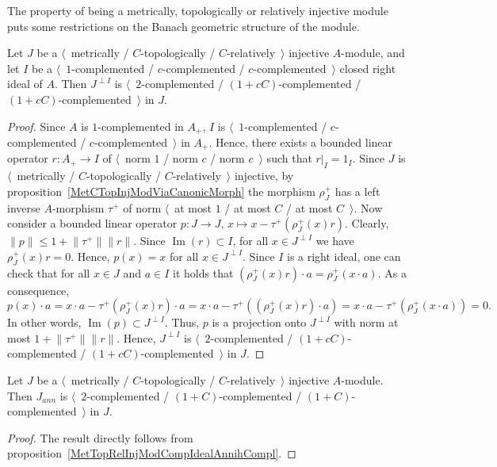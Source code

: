 The property of being a metrically, topologically or relatively injective module 
puts some restrictions on the Banach geometric structure of the module.

\begin{proposition}\label{MetTopRelInjModCompIdealAnnihCompl} Let $J$ 
be a $\langle$~metrically / $C$-topologically / $C$-relatively~$\rangle$ 
injective $A$-module, and let $I$ 
be a $\langle$~$1$-complemented / $c$-complemented / $c$-complemented~$\rangle$
closed right ideal of $A$. Then $J^{\perp I}$ 
is $\langle$~$2$-complemented / $(1+cC)$-complemented / 
$(1+cC)$-complemented~$\rangle$ in $J$.
\end{proposition}
\begin{proof} Since $A$ is $1$-complemented in $A_+$, $I$ 
is $\langle$~$1$-complemented / $c$-complemented / $c$-complemented~$\rangle$
in $A_+$. Hence, there exists a bounded linear operator $r:A_+\to I$ of 
$\langle$~norm $1$ / norm $c$ / norm $c$~$\rangle$ such that $r|_I=1_I$. 
Since $J$ is $\langle$~metrically / $C$-topologically / $C$-relatively~$\rangle$ 
injective, by proposition~\ref{MetCTopInjModViaCanonicMorph} the 
morphism $\rho_J^+$ has a left inverse $A$-morphism $\tau^+$ of norm 
$\langle$~at most $1$ / at most $C$ / at most $C$~$\rangle$. Now consider 
a bounded linear operator $p:J\to J,\, x\mapsto x-\tau^+(\rho_J^+(x)r)$. Clearly,
$\lVert p\rVert\leq 1+\lVert \tau^+\rVert\lVert r\rVert$. 
Since $\operatorname{Im}(r)\subset I$, for all $x\in J^{\perp I}$ we 
have $\rho_J^+(x)r=0$. Hence, $p(x)=x$ for all $x\in J^{\perp I}$. Since $I$ is 
a right ideal, one can check that for all $x\in J$ and $a\in I$ it holds that 
$(\rho_J^+(x)r)\cdot a=\rho_J^+(x\cdot a)$. As a consequence, 
\[
p(x)\cdot a
=x\cdot a-\tau^+(\rho_J^+(x)r)\cdot a
=x\cdot a-\tau^+((\rho_J^+(x)r)\cdot a)
=x\cdot a-\tau^+(\rho_J^+(x\cdot a))
=0.
\]
In other words, $\operatorname{Im}(p)\subset J^{\perp I}$. Thus, $p$ is 
a projection onto $J^{\perp I}$ with norm at 
most $1+\lVert \tau^+\rVert\lVert r\rVert$. Hence, $J^{\perp I}$ 
is $\langle$~$2$-complemented / $(1+cC)$-complemented / 
$(1+cC)$-complemented~$\rangle$ in $J$.
\end{proof}


\begin{corollary}\label{MetTopRelInjModAnnihCompl} Let $J$ 
be a $\langle$~metrically / $C$-topologically / $C$-relatively~$\rangle$ 
injective $A$-module. Then $J_{ann}$ 
is $\langle$~$2$-complemented / $(1+C)$-complemented / 
$(1+C)$-complemented~$\rangle$ in $J$.
\end{corollary}
\begin{proof} The result directly follows from 
proposition~\ref{MetTopRelInjModCompIdealAnnihCompl}.
\end{proof}

